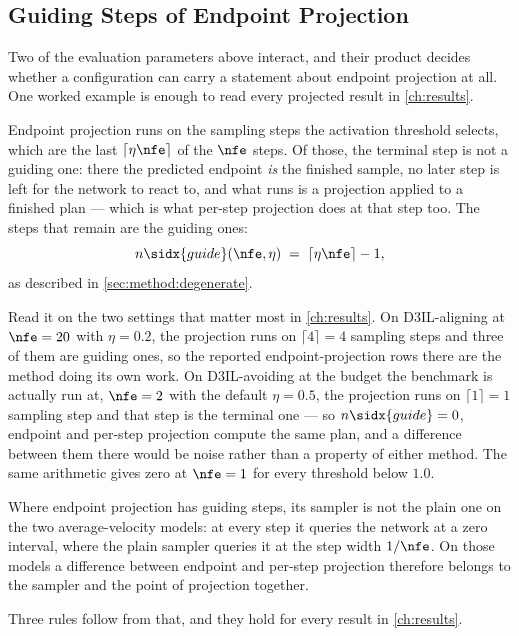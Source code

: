 \subsection{Guiding Steps of Endpoint Projection}\label{sec:setup:protocol:guiding}

Two of the evaluation parameters above interact, and their product decides whether a configuration can
carry a statement about endpoint projection at all. One worked example is enough to read every projected
result in \autoref{ch:results}.

Endpoint projection runs on the sampling steps the activation threshold selects, which are the last
$\lceil \eta\nfe \rceil$ of the $\nfe$ steps. Of those, the terminal step is not a guiding one: there the
predicted endpoint \emph{is} the finished sample, no later step is left for the network to react to, and
what runs is a projection applied to a finished plan --- which is what per-step projection does at that
step too. The steps that remain are the guiding ones:
\begin{equation*}
  n\sidx{guide}(\nfe,\eta) \;=\; \lceil \eta\nfe \rceil - 1 ,
\end{equation*}
as described in \autoref{sec:method:degenerate}.

Read it on the two settings that matter most in \autoref{ch:results}. On D3IL-aligning at
$\nfe=20$ with $\eta=0.2$, the projection runs on $\lceil 4 \rceil = 4$ sampling steps and three of them
are guiding ones, so the reported endpoint-projection rows there are the method doing its own work. On
D3IL-avoiding at the budget the benchmark is actually run at, $\nfe=2$ with the default $\eta=0.5$, the
projection runs on $\lceil 1 \rceil = 1$ sampling step and that step is the terminal one --- so
$n\sidx{guide}=0$, endpoint and per-step projection compute the same plan, and a difference between them
there would be noise rather than a property of either method. The same arithmetic gives zero at $\nfe=1$
for every threshold below $1.0$.

Where endpoint projection has guiding steps, its sampler is not the plain one on the two average-velocity
models: at every step it queries the network at a zero interval, where the plain sampler queries it at
the step width $1/\nfe$. On those models a difference between endpoint and per-step projection therefore
belongs to the sampler and the point of projection together.

Three rules follow from that, and they hold for every result in \autoref{ch:results}.

